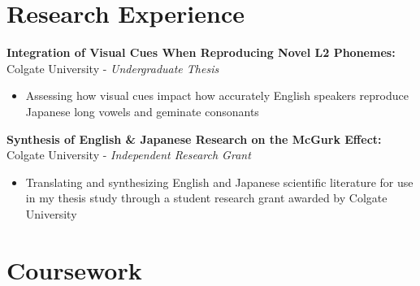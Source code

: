 \documentclass[a4paper,9pt]{extarticle}
\begin{document}
\section*{Research Experience}

\noindent
\textbf{Integration of Visual Cues When Reproducing Novel L2 Phonemes:}
Colgate University - \textit{Undergraduate Thesis}
\begin{itemize}
\item Assessing how visual cues impact how accurately English speakers reproduce Japanese long vowels and geminate consonants
\end{itemize}

\noindent
\textbf{Synthesis of English \& Japanese Research on the McGurk Effect:}
Colgate University - \textit{Independent Research Grant}
\begin{itemize}
\item Translating and synthesizing English and Japanese scientific literature for use in my thesis study through a student research grant awarded by Colgate University
\end{itemize}

\section*{Coursework}
\end{document}
